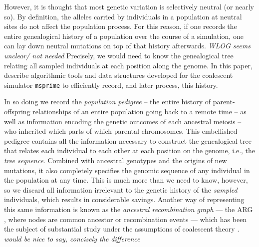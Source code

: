 \documentclass{article}
\newcommand{\msprime}{\texttt{msprime}}
\newcommand{\jda}[1]{{\em \color{cyan} #1}}
\begin{document}
However, it is thought that most genetic variation is selectively neutral (or nearly so).
By definition, the alleles carried by individuals in a population at neutral sites
do not affect the population process.
For this reason, if one records the entire genealogical history of a population over the course of a simulation,
one can lay down neutral mutations on top of that history afterwards.
\jda{WLOG seems unclear/ not needed}
Precisely, we would need to know the genealogical tree relating all sampled individuals
at each position along the genome.
In this paper, describe algorithmic tools and data structures developed for the 
coalescent simulator \msprime{}
to efficiently record, and later process, this history.

In so doing we record the \emph{population pedigree} --
the entire history of parent-offspring relationships of an entire population going back to a remote time --
as well as information encoding the genetic outcomes of each ancestral meiosis --
who inherited which parts of which parental chromosomes.
This embellished pedigree contains all the information necessary
to construct the genealogical tree that relates each individual to each other
at each position on the genome, i.e., the \emph{tree sequence}.
Combined with ancestral genotypes and the origins of new mutations,
it also completely specifies the genomic sequence of any individual in the population at any time.
This is much more than we need to know, however,
so we discard all information irrelevant to the genetic history
of the \emph{sampled} individuals,
which results in considerable savings.
Another way of representing this same information
is known as the \emph{ancestral recombination graph} ---
the {ARG} \citep{griffiths1997ancestral},
where nodes are common ancestor or recombination events ---
which has been the subject of substantial study
under the assumptions of coalescent theory \citep{wiuf1997number,wiuf1999ancestry,marjoram2006coalescent,wilton2015smc}.
\jda{would be nice to say, concisely the difference}
\end{document}
